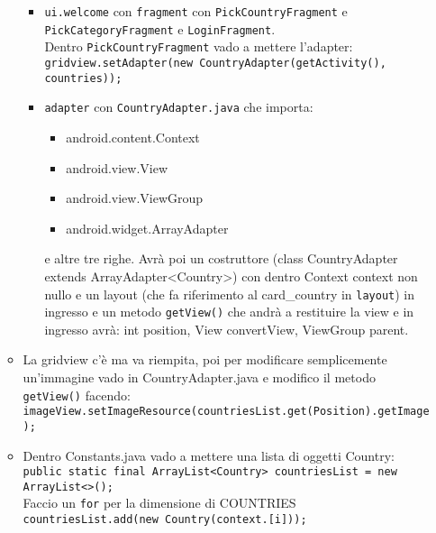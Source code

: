 \begin{itemize}
\begin{itemize}
\begin{itemize}
            \item \texttt{ui.welcome} con \texttt{fragment} con \texttt{PickCountryFragment} e \texttt{PickCategoryFragment} e \texttt{LoginFragment}.\\
            Dentro \texttt{PickCountryFragment} vado a mettere l'adapter: \texttt{gridview.setAdapter(new CountryAdapter(getActivity(), countries));}
            \item \texttt{adapter} con \texttt{CountryAdapter.java} che importa:
            \begin{itemize}
                \item android.content.Context
                \item android.view.View
                \item android.view.ViewGroup
                \item android.widget.ArrayAdapter
            \end{itemize}
            e altre tre righe. Avrà poi un costruttore (class CountryAdapter extends ArrayAdapter<Country>) con dentro Context context non nullo e un layout (che fa riferimento al card\_country in \texttt{layout}) in ingresso e un metodo \texttt{getView()} che andrà a restituire la view e in ingresso avrà: int position, View convertView, ViewGroup parent.
        \end{itemize}
        \item La gridview c'è ma va riempita, poi per modificare semplicemente un'immagine vado in CountryAdapter.java e modifico il metodo \texttt{getView()} facendo:\\
        \texttt{imageView.setImageResource(countriesList.get(Position).getImage);}
        \item Dentro Constants.java vado a mettere una lista di oggetti Country:\\
        \texttt{public static final ArrayList<Country> countriesList = new ArrayList<>();}\\
        Faccio un \texttt{for} per la dimensione di COUNTRIES\\
        \texttt{countriesList.add(new Country(context.[i]));}


\end{itemize}
\end{itemize}
